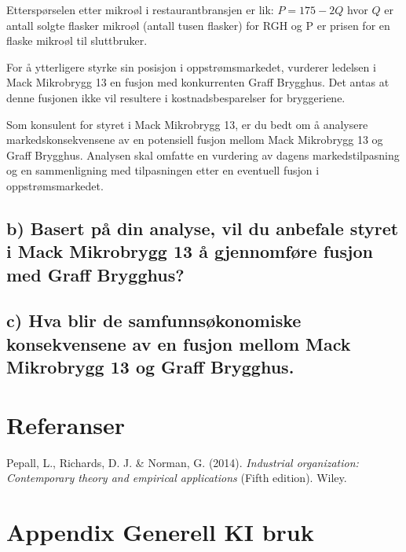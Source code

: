 \documentclass[
  12pt,
  a4paper,
  DIV=11,
  numbers=noendperiod]{scrartcl}
\newlength{\cslhangindent}
\newenvironment{CSLReferences}[2] %
 {\begin{list}{}{%
  \setlength{\itemindent}{0pt}
  \setlength{\leftmargin}{0pt}
  \setlength{\parsep}{0pt}
  \ifodd #1
   \setlength{\leftmargin}{\cslhangindent}
   \setlength{\itemindent}{-1\cslhangindent}
  \fi
  \setlength{\itemsep}{#2\baselineskip}}}
 {\end{list}}
\begin{document}
Etterspørselen etter mikroøl i restaurantbransjen er lik:
\(P = 175 − 2Q\) hvor \(Q\) er antall solgte flasker mikroøl (antall
tusen flasker) for RGH og P er prisen for en flaske mikroøl til
sluttbruker.

For å ytterligere styrke sin posisjon i oppstrømsmarkedet, vurderer
ledelsen i Mack Mikrobrygg 13 en fusjon med konkurrenten Graff Brygghus.
Det antas at denne fusjonen ikke vil resultere i kostnadsbesparelser for
bryggeriene.

Som konsulent for styret i Mack Mikrobrygg 13, er du bedt om å analysere
markedskonsekvensene av en potensiell fusjon mellom Mack Mikrobrygg 13
og Graff Brygghus. Analysen skal omfatte en vurdering av dagens
markedstilpasning og en sammenligning med tilpasningen etter en
eventuell fusjon i oppstrømsmarkedet.

\subsection{b) Basert på din analyse, vil du anbefale styret i Mack
Mikrobrygg 13 å gjennomføre fusjon med Graff
Brygghus?}\label{b-basert-puxe5-din-analyse-vil-du-anbefale-styret-i-mack-mikrobrygg-13-uxe5-gjennomfuxf8re-fusjon-med-graff-brygghus}

\subsection{c) Hva blir de samfunnsøkonomiske konsekvensene av en fusjon
mellom Mack Mikrobrygg 13 og Graff
Brygghus.}\label{c-hva-blir-de-samfunnsuxf8konomiske-konsekvensene-av-en-fusjon-mellom-mack-mikrobrygg-13-og-graff-brygghus.}

\clearpage

\section{Referanser}\label{referanser}

\label{refs}
\begin{CSLReferences}{1}{0}
Pepall, L., Richards, D. J. \& Norman, G. (2014). \emph{Industrial
organization: Contemporary theory and empirical applications} (Fifth
edition). Wiley.

\end{CSLReferences}

\clearpage

\appendix

\section {Appendix Generell KI bruk}
\end{document}

